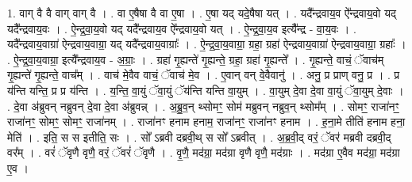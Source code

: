 \documentclass[17pt]{extarticle}
\begin{document}
1. वाग् वै वै वाग् वाग् वै । . वा ए॒षैषा वै वा ए॒षा । . ए॒षा यद् यदे॒षैषा यत् । . यदै᳚न्द्रवाय॒व ऐ᳚न्द्रवाय॒वो यद् यदै᳚न्द्रवाय॒वः । . ऐ॒न्द्र॒वा॒य॒वो यद् यदै᳚न्द्रवाय॒व ऐ᳚न्द्रवाय॒वो यत् । . ऐ॒न्द्र॒वा॒य॒व इत्यै᳚न्द्र - वा॒य॒वः । . यदै᳚न्द्रवाय॒वाग्रा॑ ऐन्द्रवाय॒वाग्रा॒ यद् यदै᳚न्द्रवाय॒वाग्राः᳚ । . ऐ॒न्द्र॒वा॒य॒वाग्रा॒ ग्रहा॒ ग्रहा॑ ऐन्द्रवाय॒वाग्रा॑ ऐन्द्रवाय॒वाग्रा॒ ग्रहाः᳚ । . ऐ॒न्द्र॒वा॒य॒वाग्रा॒ इत्यै᳚न्द्रवाय॒व - अ॒ग्राः॒ । . ग्रहा॑ गृ॒ह्यन्ते॑ गृ॒ह्यन्ते॒ ग्रहा॒ ग्रहा॑ गृ॒ह्यन्ते᳚ । . गृ॒ह्यन्ते॒ वाचं॒ ॅवाच॑म् गृ॒ह्यन्ते॑ गृ॒ह्यन्ते॒ वाच᳚म् । . वाच॑ मे॒वैव वाचं॒ ॅवाच॑ मे॒व । . ए॒वान् वन् वे॒वैवानु॑ । . अनु॒ प्र प्राण् वनु॒ प्र । . प्र य॑न्ति यन्ति॒ प्र प्र य॑न्ति । . य॒न्ति॒ वा॒युं ॅवा॒युं ॅय॑न्ति यन्ति वा॒युम् । . वा॒युम् दे॒वा दे॒वा वा॒युं ॅवा॒युम् दे॒वाः । . दे॒वा अ॑ब्रुवन् नब्रुवन् दे॒वा दे॒वा अ॑ब्रुवन्न् । . अ॒ब्रु॒व॒न् थ्सोमꣳ॒॒ सोम॑ मब्रुवन् नब्रुव॒न् थ्सोम᳚म् । . सोमꣳ॒॒ राजा॑नꣳ॒॒ राजा॑नꣳ॒॒ सोमꣳ॒॒ सोमꣳ॒॒ राजा॑नम् । . राजा॑नꣳ हनाम हनाम॒ राजा॑नꣳ॒॒ राजा॑नꣳ हनाम । . ह॒ना॒मे तीति॑ हनाम हना॒ मेति॑ । . इति॒ स स इतीति॒ सः । . सो᳚ ऽब्रवी दब्रवी॒थ् स सो᳚ ऽब्रवीत् । . अ॒ब्र॒वी॒द् वरं॒ ॅवर॑ मब्रवी दब्रवी॒द् वर᳚म् । . वरं॑ ॅवृणै वृणै॒ वरं॒ ॅवरं॑ ॅवृणै । . वृ॒णै॒ मद॑ग्रा॒ मद॑ग्रा वृणै वृणै॒ मद॑ग्राः । . मद॑ग्रा ए॒वैव मद॑ग्रा॒ मद॑ग्रा ए॒व । \newline
\end{document}

